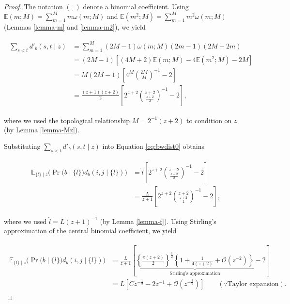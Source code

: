 \documentclass[11pt, class=article, crop=false]{standalone}
\theoremstyle{definition}
\begin{document}
\begin{proof}
The notation $\binom{\cdot}{\cdot}$ denote a binomial coefficient.
Using $\mathbb{E}(m; M) = \sum_{m=1}^M m \omega(m; M)$ and $\mathbb{E}(m^2; M) = \sum_{m=1}^M m^2 \omega(m; M)$ (Lemmas \ref{lemma-m} and \ref{lemma-m2}), we yield

\begin{align}
    \begin{split}
    \sum_{s < t} d'_b(s, t \mid z)
    &= 
    \sum_{m=1}^M (2M-1)\omega(m; M)(2m - 1) (2M - 2m)\\
    &=
    (2M - 1)
    \left[
        (4M + 2) \mathbb{E}(m; M) - 4 \mathbb{E}(m^2; M) - 2M 
    \right]\\
    &= 
    M(2M - 1)
    \left[
        4^M\binom{2M}{M}^{-1} - 2
    \right]\\
    &= 
    \frac{(z + 1)(z + 2)}{2}
    \left[
        2^{z + 2}\binom{z + 2}{\frac{z + 2}{2}}^{-1} - 2
    \right],
    \end{split}
\end{align}

where we used the topological relationship $M = 2^{-1}(z + 2)$ to condition on $z$ (by Lemma \ref{lemma-Mz}).

Substituting $\sum_{s < t} d'_b(s, t \mid z)$ into Equation \ref{eq:bwdist0} obtains

\begin{align}
\begin{split}
    \mathbb{E}_{\{l\} \mid z}
    \bigl(
    \Pr \bigl(b \mid \{l\} \bigr) d_b(i,j \mid \{l\}) 
    \bigr) 
    &=
    \hat{l} 
    \left[
        2^{z + 2}\binom{z + 2}{\frac{z + 2}{2}}^{-1} - 2
    \right]\\
    &= 
    \frac{L}{z + 1}
    \left[
        2^{z + 2}\binom{z + 2}{\frac{z + 2}{2}}^{-1} - 2
    \right],
\end{split}
\end{align}

where we used $\hat{l} = L (z + 1)^{-1}$ (by Lemma \ref{lemma-f}).
Using Stirling's approximation of the central binomial coefficient, we yield

\begin{align}
    \begin{split}
    \mathbb{E}_{\{l\} \mid z}
    \bigl(
    \Pr \bigl(b \mid \{l\} \bigr) d_b(i,j \mid \{l\}) 
    \bigr) 
    &= 
    \frac{L}{z + 1}
    \left[
    \underbrace{
        \left\{\frac{\pi(z+2)}{2} \right\}^{\frac{1}{2}} 
        \left\{
        1 + \frac{1}{4(z+2)} + \mathcal{O}(z^{-2})
        \right\}
    }_{\text{Stirling's approximation}}
    - 2
    \right]\\
    &= 
    L
    \left[
        C z^{-\frac{1}{2}} - 2z^{-1} + 
        \mathcal{O} (z^{-\frac{3}{2}})
    \right] 
    \qquad 
    (\because \text{Taylor expansion}).
    \end{split}
\end{align}


\end{proof}
\end{document}
